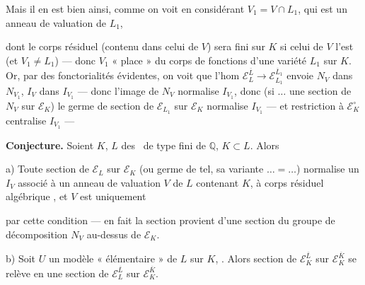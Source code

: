 \documentclass[11pt,a4paper]{article}
\begin{document}

Mais il en est bien ainsi, comme on voit en considérant $V_1 = V \cap L_1$, qui est un anneau de valuation de $L_1$,

dont le corps résiduel (contenu dans celui de $V$) sera  fini sur $K$ si celui de $V$ l'est (et $V_1 \neq L_1$) — donc $V_1$  « place » du corps de fonctions d'une variété $L_1$ sur $K$. Or, par des fonctorialités  évidentes, on voit que l'hom $\mathcal{E}_L^{\overline{L}} \to \mathcal{E}_{L_1}^{\overline{L}_1}$ envoie $N_V$ dans $N_{V_1}$, $I_V$ dans $I_{V_1}$ — donc l'image de $N_V$  normalise $I_{V_1}$, donc (si $\ldots$ une section de $N_V$ sur $\mathcal{E}_K$) le germe de section  de $\mathcal{E}_{L_1}$ sur $\mathcal{E}_K$ normalise $I_{V_1}$ — et  restriction à $\mathcal{E}_K^{\circ}$ centralise $I_{V_1}$ —


\textbf{Conjecture.} Soient $K$, $L$ des \ de type fini de $\mathbb{Q}$, $K \subset L$. Alors

a) Toute section de $\mathcal{E}_L$ sur $\mathcal{E}_K$ (ou germe de tel, sa variante $\ldots = \ldots$) normalise un $I_V$ associé à un anneau de valuation $V$ de $L$ contenant $K$, à corps résiduel algébrique , et $V$ est uniquement


par cette condition — en fait la section provient d'une section du groupe de décomposition $N_V$ au-dessus de $\mathcal{E}_K$.

b) Soit $U$ un modèle « élémentaire » de $L$ sur $K$, . Alors  section de $\mathcal{E}_K^{\overline{L}}$ sur $\mathcal{E}_K^{\overline{K}}$ se relève en une section de $\mathcal{E}_L^{\overline{L}}$ sur $\mathcal{E}_K^{\overline{K}}$.

\end{document}
